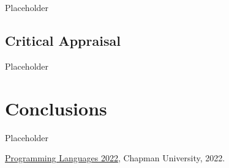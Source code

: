 \documentclass{article}
\theoremstyle{theorem}
\theoremstyle{definition}
\theoremstyle{remark}
\begin{document}
Placeholder

\subsection{Critical Appraisal}

Placeholder

\section{Conclusions}\label{conclusions}

Placeholder

\begin{thebibliography}{99}
 \href{https://github.com/alexhkurz/programming-languages-2022/blob/main/README.md}{Programming Languages 2022}, Chapman University, 2022.
\end{thebibliography}
\end{document}
